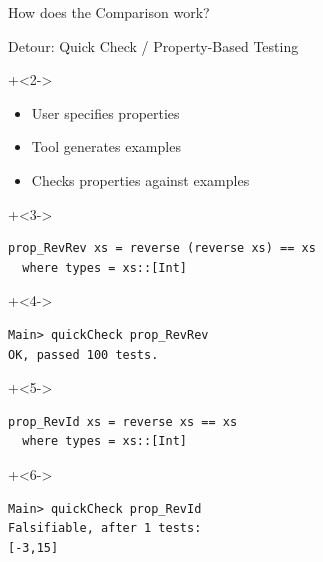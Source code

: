 \begin{frame}[fragile]{}

\end{frame}

\begin{frame}[fragile]{}

\begin{center}
{\Huge
How does the Comparison work?
}
\end{center}

\end{frame}

\begin{frame}[fragile]{Detour: Quick Check / Property-Based Testing}

\onslide+<2->
\begin{itemize}
\item User specifies properties
\item Tool generates examples
\item Checks properties against examples
\end{itemize}

\onslide+<3->
\begin{lstlisting}
prop_RevRev xs = reverse (reverse xs) == xs
  where types = xs::[Int]
\end{lstlisting}

\onslide+<4->
\begin{lstlisting}
Main> quickCheck prop_RevRev
OK, passed 100 tests.
\end{lstlisting}

\onslide+<5->
\begin{lstlisting}
prop_RevId xs = reverse xs == xs
  where types = xs::[Int]
\end{lstlisting}

\onslide+<6->
\begin{lstlisting}
Main> quickCheck prop_RevId
Falsifiable, after 1 tests:
[-3,15]
\end{lstlisting}

\end{frame}

